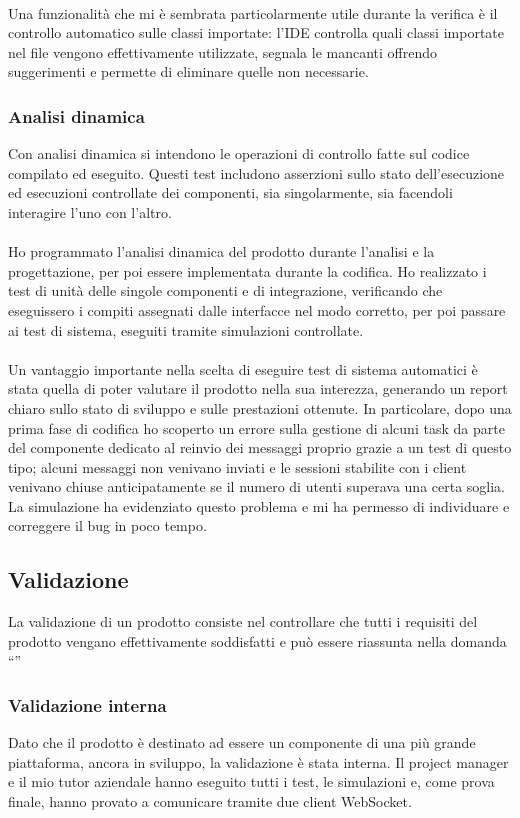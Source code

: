 		\paragraph*{}
		Una funzionalità che mi è sembrata particolarmente utile durante la verifica è il controllo automatico sulle classi importate: l'IDE controlla quali classi importate nel file vengono effettivamente utilizzate, segnala le mancanti offrendo suggerimenti e permette di eliminare quelle non necessarie.

		\subsubsection{Analisi dinamica}
		Con analisi dinamica si intendono le operazioni di controllo fatte sul codice compilato ed eseguito. Questi test includono asserzioni sullo stato dell'esecuzione ed esecuzioni controllate dei componenti, sia singolarmente, sia facendoli interagire l'uno con l'altro.
		\paragraph*{}
		Ho programmato l'analisi dinamica del prodotto durante l'analisi e la progettazione, per poi essere implementata durante la codifica. Ho realizzato i test di unità delle singole componenti e di integrazione, verificando che eseguissero i compiti assegnati dalle interfacce nel modo corretto, per poi passare ai test di sistema, eseguiti tramite simulazioni controllate.
		\paragraph*{}
		Un vantaggio importante nella scelta di eseguire test di sistema automatici è stata quella di poter valutare il prodotto nella sua interezza, generando un report chiaro sullo stato di sviluppo e sulle prestazioni ottenute. In particolare, dopo una prima fase di codifica ho scoperto un errore sulla gestione di alcuni task da parte del componente dedicato al reinvio dei messaggi proprio grazie a un test di questo tipo; alcuni messaggi non venivano inviati e le sessioni stabilite con i client venivano chiuse anticipatamente se il numero di utenti superava una certa soglia. La simulazione ha evidenziato questo problema e mi ha permesso di individuare e correggere il bug in poco tempo.

	\subsection{Validazione}
	La validazione di un prodotto consiste nel controllare che tutti i requisiti del prodotto vengano effettivamente soddisfatti e può essere riassunta nella domanda ``''
		\subsubsection{Validazione interna}
		Dato che il prodotto è destinato ad essere un componente di una più grande piattaforma, ancora in sviluppo, la validazione è stata interna. Il project manager e il mio tutor aziendale hanno eseguito tutti i test, le simulazioni e, come prova finale, hanno provato a comunicare tramite due client WebSocket.
